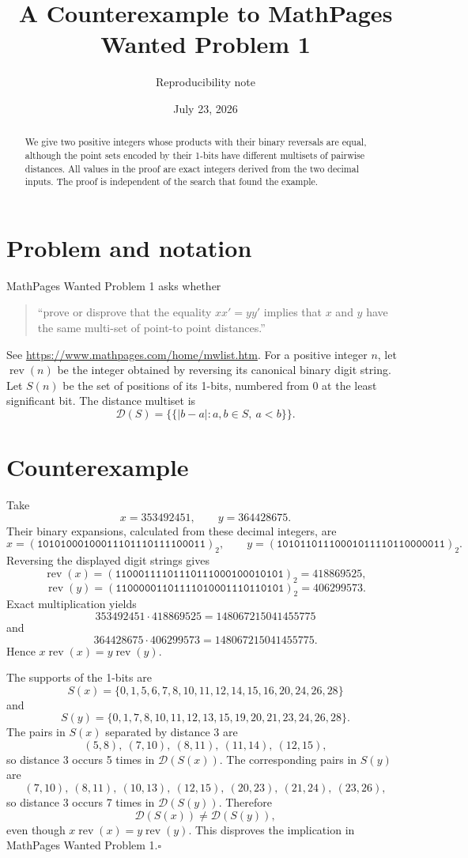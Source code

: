 \documentclass[11pt]{article}
\title{A Counterexample to MathPages Wanted Problem 1}
\author{Reproducibility note}
\date{July 23, 2026}
\newcommand{\rev}{\operatorname{rev}}
\begin{document}
\maketitle

\begin{abstract}
We give two positive integers whose products with their binary reversals are equal, although the point sets encoded by their 1-bits have different multisets of pairwise distances. All values in the proof are exact integers derived from the two decimal inputs. The proof is independent of the search that found the example.
\end{abstract}

\section*{Problem and notation}
MathPages Wanted Problem 1 asks whether
\begin{quote}
``prove or disprove that the equality $xx'=yy'$ implies that $x$ and $y$ have the same multi-set of point-to point distances.''
\end{quote}
See \url{https://www.mathpages.com/home/mwlist.htm}. For a positive integer $n$, let $\rev(n)$ be the integer obtained by reversing its canonical binary digit string. Let $S(n)$ be the set of positions of its 1-bits, numbered from 0 at the least significant bit. The distance multiset is
\[
\mathcal D(S)=\{\!\{|b-a|:a,b\in S,\ a<b\}\!\}.
\]

\section*{Counterexample}
Take
\[
x=353492451,\qquad y=364428675.
\]
Their binary expansions, calculated from these decimal integers, are
\[
x=(\mathtt{10101000100011101110111100011})_2,
\qquad
y=(\mathtt{10101101110001011110110000011})_2.
\]
Reversing the displayed digit strings gives
\[
\rev(x)=(\mathtt{11000111101110111000100010101})_2=418869525,
\]
\[
\rev(y)=(\mathtt{11000001101111010001110110101})_2=406299573.
\]
Exact multiplication yields
\[
353492451\cdot 418869525=148067215041455775
\]
and
\[
364428675\cdot 406299573=148067215041455775.
\]
Hence $x\rev(x)=y\rev(y)$.

The supports of the 1-bits are
\[
S(x)=\{0, 1, 5, 6, 7, 8, 10, 11, 12, 14, 15, 16, 20, 24, 26, 28\}
\]
and
\[
S(y)=\{0, 1, 7, 8, 10, 11, 12, 13, 15, 19, 20, 21, 23, 24, 26, 28\}.
\]
The pairs in $S(x)$ separated by distance 3 are
\[
(5,8),\ (7,10),\ (8,11),\ (11,14),\ (12,15),
\]
so distance 3 occurs 5 times in $\mathcal D(S(x))$. The corresponding pairs in $S(y)$ are
\[
(7,10),\ (8,11),\ (10,13),\ (12,15),\ (20,23),\ (21,24),\ (23,26),
\]
so distance 3 occurs 7 times in $\mathcal D(S(y))$. Therefore
\[
\mathcal D(S(x))\ne\mathcal D(S(y)),
\]
even though $x\rev(x)=y\rev(y)$. This disproves the implication in MathPages Wanted Problem 1.\hfill\(\square\)
\end{document}
